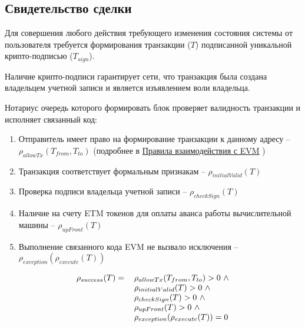 \documentclass[12pt]{report}
\begin{document}
\subsection{Свидетельство сделки}
\label{tech-blockchain-confirmation}
\begin{multicols}{2}
Для совершения любого действия требующего изменения состояния системы от пользователя требуется формирования транзакции ($T$) подписанной уникальной крипто-подписью ($T_{sign}$). 

Наличие крипто-подписи гарантирует сети, что транзакция была создана владельцем учетной записи и является изъявлением воли владельца.

Нотариус очередь которого формировать блок проверяет валидность транзакции и исполняет связанный код:
\begin{enumerate}
\item Отправитель имеет право на формирование транзакции к данному адресу – $\rho_{allowTx}(T_{from}, T_{to})$ (подробнее в \hyperref[tech-blockchain-rules]{Правила взаимодействия с EVM}		)
\item Транзакция соответствует формальным признакам –  $\rho_{initialValid}(T)$
\item Проверка подписи владельца учетной записи –  $\rho_{checkSign}(T)$
\item Наличие на счету ETM токенов для оплаты аванса работы вычислительной машины – $\rho_{upFront}(T)$
\item Выполнение связанного кода EVM не вызвало исключения – $\rho_{exception}(\rho_{execute}(T))$
\end{enumerate}
\end{multicols}
\begin{equation}
\begin{tabular}{ r l }
$\rho_{success}(T) =$ & $\rho_{allowTx}(T_{from}, T_{to}) > 0 \ \wedge $ \\
 \ & $\rho_{initialValid}(T) > 0 \ \wedge $ \\
 \ & $\rho_{checkSign}(T) > 0 \ \wedge $ \\
 \ & $\rho_{upFront}(T) > 0 \ \wedge $ \\
 \ & $\rho_{exception}(\rho_{execute}(T)) = 0 $
\end{tabular}
\end{equation}
\end{document}
